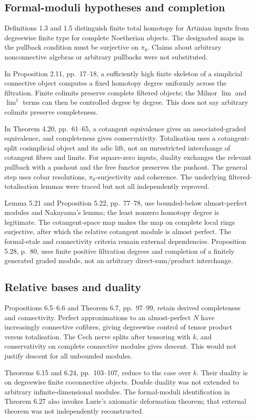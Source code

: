 \documentclass[10pt]{article}
\begin{document}
\subsection*{Formal-moduli hypotheses and completion}
Definitions 1.3 and 1.5 distinguish finite total homotopy for Artinian inputs from degreewise finite type for complete Noetherian objects. The designated maps in the pullback condition must be surjective on \(\pi_0\). Claims about arbitrary nonconnective algebras or arbitrary pullbacks were not substituted.\par
In Proposition 2.11, pp. 17–18, a sufficiently high finite skeleton of a simplicial connective object computes a fixed homotopy degree uniformly across the filtration. Finite colimits preserve complete filtered objects; the Milnor \(\lim\) and \(\lim^1\) terms can then be controlled degree by degree. This does not say arbitrary colimits preserve completeness.\par
In Theorem 4.20, pp. 61–65, a cotangent equivalence gives an associated-graded equivalence, and completeness gives conservativity. Totalisation uses a cotangent-split cosimplicial object and its adic lift, not an unrestricted interchange of cotangent fibres and limits. For square-zero inputs, duality exchanges the relevant pullback with a pushout and the free functor preserves the pushout. The general step uses cobar resolutions, \(\pi_0\)-surjectivity and coherence. The underlying filtered-totalisation lemmas were traced but not all independently reproved.\par
Lemma 5.21 and Proposition 5.22, pp. 77–78, use bounded-below almost-perfect modules and Nakayama’s lemma; the least nonzero homotopy degree is legitimate. The cotangent-space map makes the map on complete local rings surjective, after which the relative cotangent module is almost perfect. The formal-etale and connectivity criteria remain external dependencies. Proposition 5.28, p. 80, uses finite positive filtration degrees and completion of a finitely generated graded module, not an arbitrary direct-sum/product interchange.\par
\subsection*{Relative bases and duality}
Propositions 6.5–6.6 and Theorem 6.7, pp. 97–99, retain derived completeness and connectivity. Perfect approximations to an almost-perfect \(N\) have increasingly connective cofibres, giving degreewise control of tensor product versus totalisation. The Cech nerve splits after tensoring with \(k\), and conservativity on complete connective modules gives descent. This would not justify descent for all unbounded modules.\par
Theorems 6.15 and 6.24, pp. 103–107, reduce to the case over \(k\). Their duality is on degreewise finite coconnective objects. Double duality was not extended to arbitrary infinite-dimensional modules. The formal-moduli identification in Theorem 6.27 also invokes Lurie’s axiomatic deformation theorem; that external theorem was not independently reconstructed.\par
\end{document}

